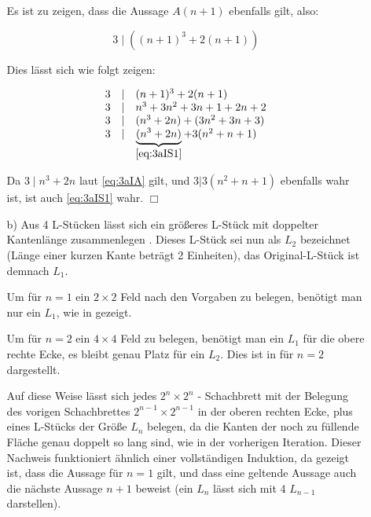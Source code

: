 \documentclass[a4paper,10pt]{scrartcl}
\begin{document}
\begin{enumerate}
\begin{enumerate}
                Es ist zu zeigen, dass die Aussage $A(n + 1)$ ebenfalls gilt, also:

                \begin{equation}\label{eq:3aIS1}
                    3 \mid \left((n+1)^3 + 2(n+1)\right)
                \end{equation}

                Dies lässt sich wie folgt zeigen:

                \begin{equation}\begin{array}{rcl}\label{eq:3aIS2}
                    3 &\mid& (n+1)^3 + 2(n+1)\\
                    3 &\mid& n^3 + 3n^2 + 3n +1 + 2n + 2\\
                    3 &\mid& (n^3 + 2n) + (3n^2  + 3n + 3)\\
                    3 &\mid& \underbrace{(n^3 + 2n)}_{\eqref{eq:3aIS1}} + 3 (n^2  + n + 1)
                \end{array}\end{equation}

                Da $3 \mid n^3 + 2n$ laut \eqref{eq:3aIA} gilt, und $3 | 3(n^2 + n + 1)$ ebenfalls
                wahr ist, ist auch \eqref{eq:3aIS1} wahr. $\Box$

            \item[b)]
                Aus 4 L-Stücken lässt sich ein größeres L-Stück mit doppelter Kantenlänge zusammenlegen .
                Dieses L-Stück sei nun als $L_2$ bezeichnet (Länge einer kurzen Kante beträgt 2 Einheiten), das
                Original-L-Stück ist demnach $L_1$.

                Um für $n = 1$ ein $2 \times 2$ Feld nach den Vorgaben zu belegen, benötigt man nur ein $L_1$,
                wie in  gezeigt.

                Um für $n = 2$ ein $4 \times 4$ Feld zu belegen, benötigt man ein $L_1$ für die obere rechte
                Ecke, es bleibt genau Platz für ein $L_2$. Dies ist in  für $n = 2$ dargestellt.

                Auf diese Weise lässt sich jedes $2^n \times 2^n$ - Schachbrett mit der Belegung des vorigen Schachbrettes
                $2^{n-1} \times 2^{n-1}$ in der oberen rechten Ecke, plus eines L-Stücks der Größe $L_n$ belegen, da die Kanten
                der noch zu füllende Fläche genau doppelt so lang sind, wie in der vorherigen
                Iteration. Dieser Nachweis funktioniert ähnlich einer vollständigen Induktion,
                da gezeigt ist, dass die Aussage für $n = 1$ gilt, und dass eine geltende
                Aussage auch die nächste Aussage $n + 1$ beweist (ein $L_n$ lässt sich mit 4
                $L_{n-1}$ darstellen).


\end{enumerate}
\end{enumerate}
\end{document}
